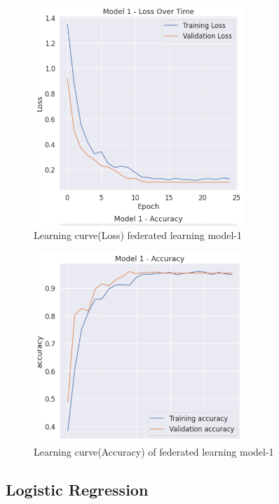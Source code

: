 \documentclass[12pt,conference]{IEEEtran}
\begin{document}
\begin{figure} [!t]
	\centering
	\includegraphics[width=3.1in]{Model_1_loss.PNG}
	\caption{Learning curve(Loss) federated learning model-1}
	\label{Learning curve for LoT of federated learning model-1}
\end{figure}

\begin{figure} [!t]
	\centering
	\includegraphics[width=3.1in]{model1_accuracy.PNG}
	\caption{Learning curve(Accuracy) of federated learning model-1}
	\label{Learning curve for the accuracy of federated learning model-1}
\end{figure}

\subsection{Logistic Regression}
\end{document}
